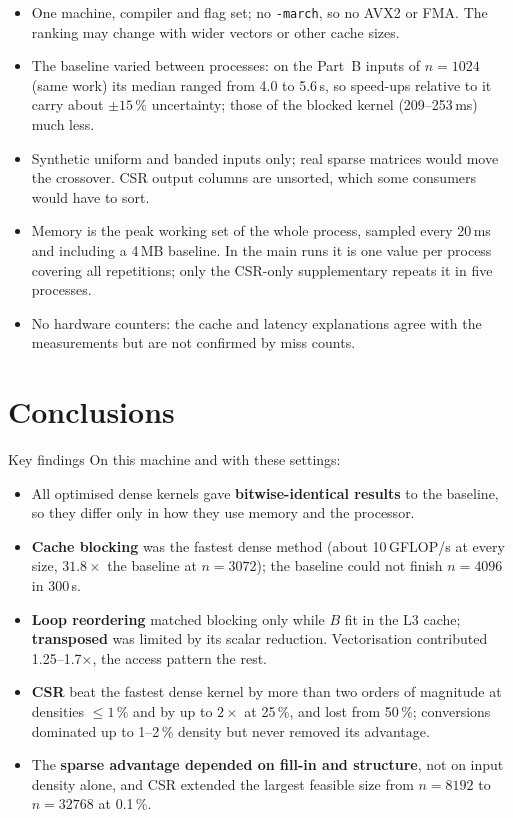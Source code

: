 \documentclass[11pt,a4paper]{article}
\newcommand{\concept}[1]{\par\addvspace{8pt}\Needspace{5\baselineskip}%
  \noindent{\color{accent}\bfseries\boldmath #1}\par\nopagebreak\vspace{2pt}}
\begin{document}
\concept{Limitations}
\begin{itemize}[leftmargin=1.4em]
  \item One machine, compiler and flag set; no \texttt{-march}, so no AVX2 or FMA. The ranking
        may change with wider vectors or other cache sizes.
  \item The baseline varied between processes: on the Part~B inputs of $n=1024$ (same work) its
        median ranged from 4.0 to 5.6\,s, so speed-ups relative to it carry about $\pm15\,\%$
        uncertainty; those of the blocked kernel (209--253\,ms) much less.
  \item Synthetic uniform and banded inputs only; real sparse matrices would move the crossover.
        CSR output columns are unsorted, which some consumers would have to sort.
  \item Memory is the peak working set of the whole process, sampled every 20\,ms and
        including a 4\,MB baseline. In the main runs it is one value per process covering all
        repetitions; only the CSR-only supplementary repeats it in five processes.
  \item No hardware counters: the cache and latency explanations agree with the measurements but
        are not confirmed by miss counts.
\end{itemize}

\section{Conclusions}
\begin{titledbox}{Key findings}
On this machine and with these settings:
\begin{itemize}[leftmargin=1.2em]
  \item All optimised dense kernels gave \textbf{bitwise-identical results} to the baseline, so
        they differ only in how they use memory and the processor.
  \item \textbf{Cache blocking} was the fastest dense method (about 10\,GFLOP/s at every size,
        $31.8\times$ the baseline at $n=3072$); the baseline could not finish $n=4096$ in 300\,s.
  \item \textbf{Loop reordering} matched blocking only while $B$ fit in the L3 cache;
        \textbf{transposed} was limited by its scalar reduction. Vectorisation contributed
        1.25--1.7$\times$, the access pattern the rest.
  \item \textbf{CSR} beat the fastest dense kernel by more than two orders of magnitude at
        densities $\le1\,\%$ and by up to $2\times$ at 25\,\%, and lost from 50\,\%; conversions
        dominated up to 1--2\,\% density but never removed its advantage.
  \item The \textbf{sparse advantage depended on fill-in and structure}, not on input density
        alone, and CSR extended the largest feasible size from $n=8192$ to $n=32768$ at 0.1\,\%.
\end{itemize}
\end{titledbox}
\end{document}
